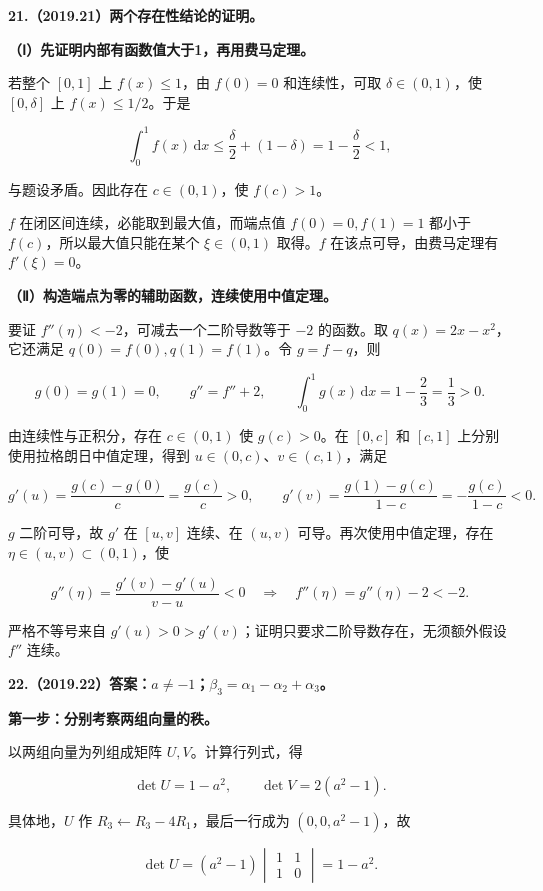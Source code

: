 \documentclass[UTF8,11pt,fontset=windows]{ctexart}
\begin{document}
\textbf{21.（2019.21）两个存在性结论的证明。}

\textbf{（Ⅰ）先证明内部有函数值大于1，再用费马定理。}

若整个 $[0,1]$ 上 $f(x)\le1$，由 $f(0)=0$ 和连续性，可取 $\delta\in(0,1)$，使 $[0,\delta]$ 上 $f(x)\le1/2$。于是

$$
\int_0^1f(x)\,\mathrm dx
\le\frac\delta2+(1-\delta)=1-\frac\delta2<1,
$$

与题设矛盾。因此存在 $c\in(0,1)$，使 $f(c)>1$。

$f$ 在闭区间连续，必能取到最大值，而端点值 $f(0)=0,f(1)=1$ 都小于 $f(c)$，所以最大值只能在某个 $\xi\in(0,1)$ 取得。$f$ 在该点可导，由费马定理有 $\boxed{f'(\xi)=0}$。

\textbf{（Ⅱ）构造端点为零的辅助函数，连续使用中值定理。}

要证 $f''(\eta)<-2$，可减去一个二阶导数等于 $-2$ 的函数。取 $q(x)=2x-x^2$，它还满足 $q(0)=f(0),q(1)=f(1)$。令 $g=f-q$，则

$$
g(0)=g(1)=0,\qquad g''=f''+2,
\qquad \int_0^1g(x)\,\mathrm dx=1-\frac23=\frac13>0.
$$

由连续性与正积分，存在 $c\in(0,1)$ 使 $g(c)>0$。在 $[0,c]$ 和 $[c,1]$ 上分别使用拉格朗日中值定理，得到 $u\in(0,c)$、$v\in(c,1)$，满足

$$
g'(u)=\frac{g(c)-g(0)}c=\frac{g(c)}c>0,
\qquad g'(v)=\frac{g(1)-g(c)}{1-c}=-\frac{g(c)}{1-c}<0.
$$

$g$ 二阶可导，故 $g'$ 在 $[u,v]$ 连续、在 $(u,v)$ 可导。再次使用中值定理，存在 $\eta\in(u,v)\subset(0,1)$，使

$$
g''(\eta)=\frac{g'(v)-g'(u)}{v-u}<0
\quad\Longrightarrow\quad
\boxed{f''(\eta)=g''(\eta)-2<-2.}
$$

严格不等号来自 $g'(u)>0>g'(v)$；证明只要求二阶导数存在，无须额外假设 $f''$ 连续。

\clearpage

\textbf{22.（2019.22）答案：$a\ne-1$；$\beta_3=\alpha_1-\alpha_2+\alpha_3$。}

\textbf{第一步：分别考察两组向量的秩。}

以两组向量为列组成矩阵 $U,V$。计算行列式，得

$$
\det U=1-a^2,\qquad \det V=2(a^2-1).
$$

具体地，$U$ 作 $R_3\leftarrow R_3-4R_1$，最后一行成为 $(0,0,a^2-1)$，故

$$
\det U=(a^2-1)\begin{vmatrix}1&1\\1&0\end{vmatrix}=1-a^2.
$$
\end{document}
